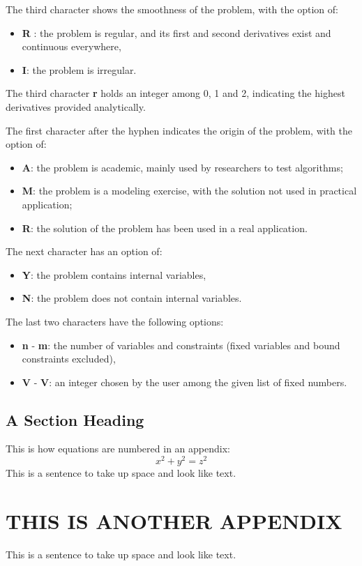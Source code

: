 The third character shows the smoothness of the problem, with the option of:
\begin{itemize}  \itemsep -8pt 
\item  \textbf{R} : the problem is regular, and its first and second derivatives exist and continuous everywhere,
\item  \textbf{I}: the problem is irregular.
\end{itemize}

The third character \textbf{r} holds an integer among 0, 1 and 2, indicating the highest derivatives provided analytically.

The first character after the hyphen indicates the origin of the problem, with the option of:
\begin{itemize}  \itemsep -8pt 
\item  \textbf{A}: the problem is academic, mainly used by researchers to test algorithms; 
\item  \textbf{M}: the problem is a modeling exercise, with the solution not used in practical application; 
\item  \textbf{R}: the solution of the problem has been used in a real application.  
\end{itemize}

The next character has an option of: 
\begin{itemize}  \itemsep -8pt 
\item \textbf{Y}: the problem contains internal variables, 
\item \textbf{N}: the problem does not contain internal variables. 
\end{itemize}

The last two characters have the following options:
\begin{itemize}  \itemsep -8pt 
\item \textbf{n} - \textbf{m}: the number of variables and constraints (fixed variables and bound constraints excluded), 
\item \textbf{V} - \textbf{V}: an integer chosen by the user among the given list of fixed numbers.
\end{itemize}


\section{A Section Heading}

This is how equations are numbered in an appendix:
\begin{equation}
x^2 + y^2 = z^2
\end{equation} 
This is a sentence to take up space and look like text.

\chapter{THIS IS ANOTHER APPENDIX} 
This is a sentence to take up space and look like text.
